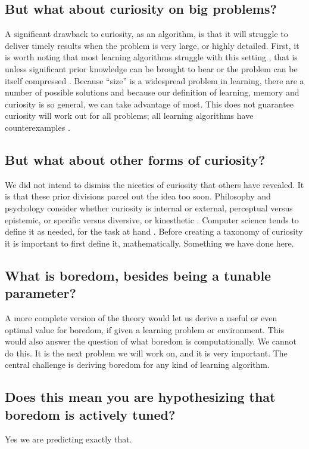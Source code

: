 \subsection*{But what about curiosity on big problems?}
A significant drawback to curiosity, as an algorithm, is that it will struggle to deliver timely results when the problem is very large, or highly detailed. First, it is worth noting that most learning algorithms struggle with this setting \cite{MacKay2003,Sutton2018}, that is unless significant prior knowledge can be brought to bear \cite{Zhang2020,Sutton2018} or the problem can be itself compressed \cite{Ha2018a,Fister2019}. Because ``size'' is a widespread problem in learning, there are a number of possible solutions and because our definition of learning, memory and curiosity is so general, we can take advantage of most. This does not guarantee curiosity will work out for all problems; all learning algorithms have counterexamples \cite{Wolpert1997}. 


\subsection*{But what about other forms of curiosity?}
We did not intend to dismiss the niceties of curiosity that others have revealed. It is that these prior divisions parcel out the idea too soon. Philosophy and psychology consider whether curiosity is internal or external, perceptual versus epistemic, or specific versus diversive, or kinesthetic \cite{Kidd2015,Berlyne1950,Zhou2020}. Computer science tends to define it as needed, for the task at hand \cite{Stanley2004,Lehman2011a,Lehman2013,Mouret2015,Colas2020}. Before creating a taxonomy of curiosity it is important to first define it, mathematically. Something we have done here.


\subsection*{What is boredom, besides being a tunable parameter?}
A more complete version of the theory would let us derive a useful or even optimal value for boredom, if given a learning problem or environment. This would also answer the question of what boredom is computationally. We cannot do this. It is the next problem we will work on, and it is very important. The central challenge is deriving boredom for any kind of learning algorithm.


\subsection*{Does this mean you are hypothesizing that boredom is actively tuned?}
Yes we are predicting exactly that.



